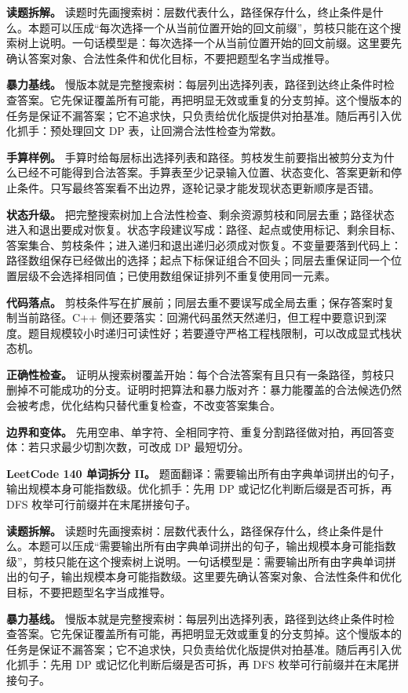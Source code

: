 \textbf{读题拆解。} 读题时先画搜索树：层数代表什么，路径保存什么，终止条件是什么。本题可以压成“每次选择一个从当前位置开始的回文前缀”，剪枝只能在这个搜索树上说明。一句话模型是：每次选择一个从当前位置开始的回文前缀。这里要先确认答案对象、合法性条件和优化目标，不要把题型名字当成推导。

\textbf{暴力基线。} 慢版本就是完整搜索树：每层列出选择列表，路径到达终止条件时检查答案。它先保证覆盖所有可能，再把明显无效或重复的分支剪掉。这个慢版本的任务是保证不漏答案；它不追求快，只负责给优化版提供对拍基准。随后再引入优化抓手：预处理回文 DP 表，让回溯合法性检查为常数。

\textbf{手算样例。} 手算时给每层标出选择列表和路径。剪枝发生前要指出被剪分支为什么已经不可能得到合法答案。手算表至少记录输入位置、状态变化、答案更新和停止条件。只写最终答案看不出边界，逐轮记录才能发现状态更新顺序是否错。

\textbf{状态升级。} 把完整搜索树加上合法性检查、剩余资源剪枝和同层去重；路径状态进入和退出要成对恢复。状态字段建议写成：路径、起点或使用标记、剩余目标、答案集合、剪枝条件；进入递归和退出递归必须成对恢复。不变量要落到代码上：路径数组保存已经做出的选择；起点下标保证组合不回头；同层去重保证同一个位置层级不会选择相同值；已使用数组保证排列不重复使用同一元素。

\textbf{代码落点。} 剪枝条件写在扩展前；同层去重不要误写成全局去重；保存答案时复制当前路径。C++ 侧还要落实：回溯代码虽然天然递归，但工程中要意识到深度。题目规模较小时递归可读性好；若要遵守严格工程栈限制，可以改成显式栈状态机。

\textbf{正确性检查。} 证明从搜索树覆盖开始：每个合法答案有且只有一条路径，剪枝只删掉不可能成功的分支。证明时把算法和暴力版对齐：暴力能覆盖的合法候选仍然会被考虑，优化结构只替代重复检查，不改变答案集合。

\textbf{边界和变体。} 先用空串、单字符、全相同字符、重复分割路径做对拍，再回答变体：若只求最少切割次数，可改成 DP 最短切分。

\noindent\textbf{LeetCode 140 单词拆分 II。} 题面翻译：需要输出所有由字典单词拼出的句子，输出规模本身可能指数级。优化抓手：先用 DP 或记忆化判断后缀是否可拆，再 DFS 枚举可行前缀并在末尾拼接句子。

\textbf{读题拆解。} 读题时先画搜索树：层数代表什么，路径保存什么，终止条件是什么。本题可以压成“需要输出所有由字典单词拼出的句子，输出规模本身可能指数级”，剪枝只能在这个搜索树上说明。一句话模型是：需要输出所有由字典单词拼出的句子，输出规模本身可能指数级。这里要先确认答案对象、合法性条件和优化目标，不要把题型名字当成推导。

\textbf{暴力基线。} 慢版本就是完整搜索树：每层列出选择列表，路径到达终止条件时检查答案。它先保证覆盖所有可能，再把明显无效或重复的分支剪掉。这个慢版本的任务是保证不漏答案；它不追求快，只负责给优化版提供对拍基准。随后再引入优化抓手：先用 DP 或记忆化判断后缀是否可拆，再 DFS 枚举可行前缀并在末尾拼接句子。

